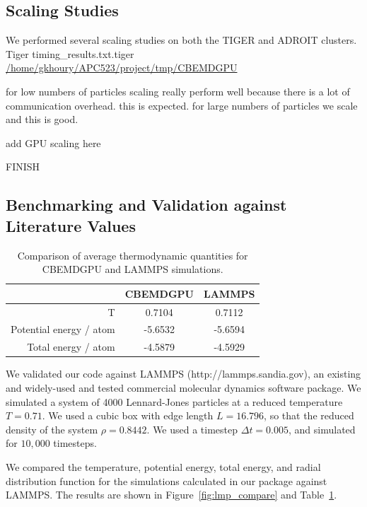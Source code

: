 \documentclass[12pt]{article}
\begin{document}
\subsection{Scaling Studies}
\label{sec:scalingstudies}

We performed several scaling studies on both the TIGER and ADROIT clusters.
Tiger timing\_results.txt.tiger
\url{/home/gkhoury/APC523/project/tmp/CBEMDGPU}

for low numbers of particles scaling really  perform well because there is a lot of communication overhead.
this is expected.
for large numbers of particles we scale and this is good.

add GPU scaling here


FINISH


\subsection{Benchmarking and Validation against Literature Values}

\begin{table}[H]
\begin{centering}
	\begin{tabular}{| r | c | c |}
		\hline
		 & CBEMDGPU & LAMMPS \\
		 \hline
		 T & 0.7104 & 0.7112 \\
		 \hline
		 Potential energy / atom & -5.6532 & -5.6594 \\
		 \hline
		 Total energy / atom & -4.5879 & -4.5929 \\
		 \hline
	\end{tabular}
	\caption{Comparison of average thermodynamic quantities for CBEMDGPU and LAMMPS simulations.}
	\label{table:lmp_compare}
\end{centering}
\end{table}

We validated our code against LAMMPS \cite{Plimpton1995} (http://lammps.sandia.gov), an existing and widely-used and tested commercial molecular dynamics software package.
%
We simulated a system of 4000 Lennard-Jones particles at a reduced temperature $T=0.71$.
%
We used a cubic box with edge length $L=16.796$, so that the reduced density of the system $\rho = 0.8442$.
%
We used a timestep $\Delta t=0.005$, and simulated for $10,000$ timesteps.


We compared the temperature, potential energy, total energy, and radial distribution function for the simulations calculated in our package against LAMMPS.
%
The results are shown in Figure~\ref{fig:lmp_compare} and Table~\ref{table:lmp_compare}.
%
\end{document}
